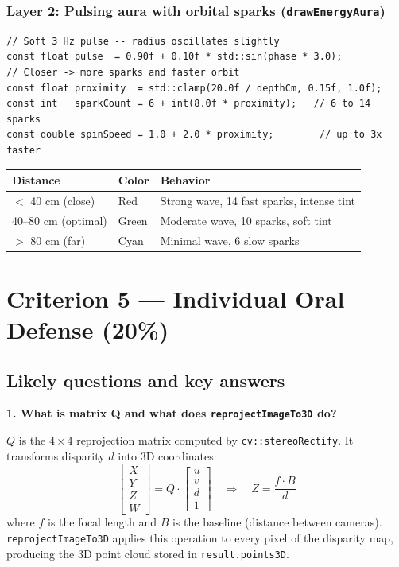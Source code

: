 \documentclass[11pt,a4paper]{article}
\begin{document}
\subsubsection*{Layer 2: Pulsing aura with orbital sparks (\texttt{drawEnergyAura})}

\begin{lstlisting}[caption={Pulse and spark speed reactive to Z}]
// Soft 3 Hz pulse -- radius oscillates slightly
const float pulse  = 0.90f + 0.10f * std::sin(phase * 3.0);
// Closer -> more sparks and faster orbit
const float proximity  = std::clamp(20.0f / depthCm, 0.15f, 1.0f);
const int   sparkCount = 6 + int(8.0f * proximity);   // 6 to 14 sparks
const double spinSpeed = 1.0 + 2.0 * proximity;        // up to 3x faster
\end{lstlisting}

\begin{center}
\begin{tabular}{lll}
\toprule
\textbf{Distance} & \textbf{Color} & \textbf{Behavior} \\
\midrule
$<$ 40 cm (close)   & Red   & Strong wave, 14 fast sparks, intense tint \\
40--80 cm (optimal) & Green & Moderate wave, 10 sparks, soft tint \\
$>$ 80 cm (far)     & Cyan  & Minimal wave, 6 slow sparks \\
\bottomrule
\end{tabular}
\end{center}

\section{Criterion 5 --- Individual Oral Defense (20\%)}

\subsection*{Likely questions and key answers}

\textbf{1. What is matrix Q and what does \texttt{reprojectImageTo3D} do?}

$Q$ is the $4\times4$ reprojection matrix computed by \texttt{cv::stereoRectify}.
It transforms disparity $d$ into 3D coordinates:
\[
\begin{bmatrix} X \\ Y \\ Z \\ W \end{bmatrix} =
Q \cdot \begin{bmatrix} u \\ v \\ d \\ 1 \end{bmatrix}
\quad\Rightarrow\quad Z = \frac{f \cdot B}{d}
\]
where $f$ is the focal length and $B$ is the baseline (distance between cameras).
\texttt{reprojectImageTo3D} applies this operation to every pixel of the disparity map,
producing the 3D point cloud stored in \texttt{result.points3D}.
\end{document}
